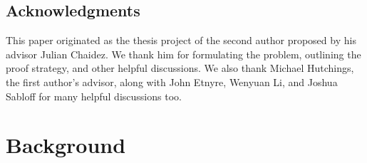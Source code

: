 \documentclass[11pt]{amsart}
\theoremstyle{mystyle}
\newcommand{\R}{\mathbb{R}}
\newcommand{\de}{\text{d}}
\newcommand{\<}{\langle}
\renewcommand{\>}{\rangle}
\begin{document}
\subsection*{Acknowledgments}
    This paper originated as the thesis project of the second author proposed by his advisor Julian Chaidez. We thank him for formulating the problem, outlining the proof strategy, and other helpful discussions. We also thank Michael Hutchings, the first author's advisor, along with John Etnyre, Wenyuan Li, and Joshua Sabloff for many helpful discussions too. 
\section{Background}\label{sec:background}


\end{document}
